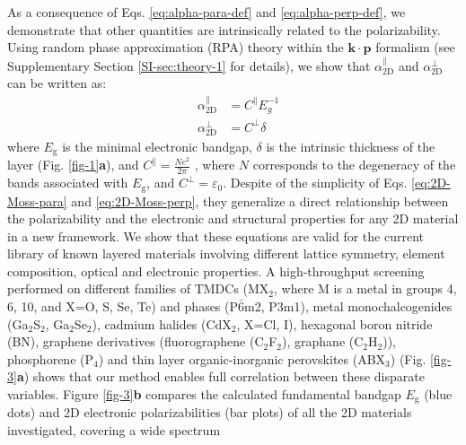 \documentclass[journal=ancac3,manuscript=article,email=true,hyperref=true,keywords=false]{achemso}
\begin{document}

As a consequence of Eqs. \ref{eq:alpha-para-def} and
\ref{eq:alpha-perp-def}, we demonstrate that other quantities are
intrinsically related to the polarizability.  Using random phase
approximation (RPA) theory \cite{Adler_1962} within the
$\mathbf{k} \cdot \mathbf{p}$ formalism\cite{kittel_2005_introduction}
(see Supplementary Section \ref{SI-sec:theory-1} for details), we show
that $\alpha_{\mathrm{2D}}^{\parallel}$ and
$\alpha_{\mathrm{2D}}^{\perp}$ can be written as:
\begin{subequations}
\begin{eqnarray}
\label{eq:2D-Moss-para}
  &\alpha_{\mathrm{2D}}^{\parallel} &=C^{\parallel} E_{g}^{-1} \\
  \label{eq:2D-Moss-perp}
  &\alpha_{\mathrm{2D}}^{\perp} & =C^{\perp} \delta
\end{eqnarray}
\end{subequations}
where $E_{\mathrm{g}}$ is the minimal electronic bandgap, $\delta$ is
the intrinsic thickness of the layer (Fig. \ref{fig-1}{\textbf a}), and
$C^{\parallel} = {\displaystyle \frac{Ne^2}{2 \pi}}$ \cite{Jiang_2017_Eg_Eb}, where
$N$ corresponds to the degeneracy of the bands associated with
$E_{\mathrm{g}}$, and $C^{\perp} = {\varepsilon_{0}}$.
Despite of the simplicity of Eqs. \ref{eq:2D-Moss-para} and
\ref{eq:2D-Moss-perp}, they generalize a direct relationship between
the polarizability and the electronic and structural properties for
any 2D material in a new framework.  We show that these equations are
valid for the current library of known layered materials involving
different lattice symmetry, element composition, optical and
electronic properties.
%
A high-throughput screening performed on different families of TMDCs
(MX\(_{\text{2}}\), where M is a metal in groups 4, 6, 10, and X=O, S,
Se, Te) and phases (P\(\bar{6}\)m2, P3m1), metal monochalcogenides
(Ga$_{2}$S$_{2}$, Ga$_{2}$Se$_{2}$), cadmium halides (CdX$_2$, X=Cl,
I), hexagonal boron nitride (BN), graphene derivatives (fluorographene
(C$_{2}$F$_{2}$), graphane (C$_{2}$H$_{2}$)), phosphorene (P$_{4}$)
and thin layer organic-inorganic perovskites (ABX$_{3}$)
(Fig. \ref{fig-3}{\textbf a}) shows that our method enables full
correlation between these disparate variables.  Figure
\ref{fig-3}{\textbf b} compares the calculated fundamental bandgap
$E_{\mathrm{g}}$ (blue dots) and 2D electronic polarizabilities (bar
plots) of all the 2D materials investigated, covering a wide spectrum
\end{document}
